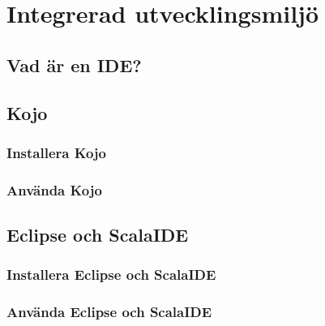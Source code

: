 
\chapter{Integrerad utvecklingsmiljö}

\section{Vad är en IDE?}

\section{Kojo}

\subsection{Installera Kojo}

\subsection{Använda Kojo}


\section{Eclipse och ScalaIDE}

\subsection{Installera Eclipse och ScalaIDE}

\subsection{Använda Eclipse och ScalaIDE}

